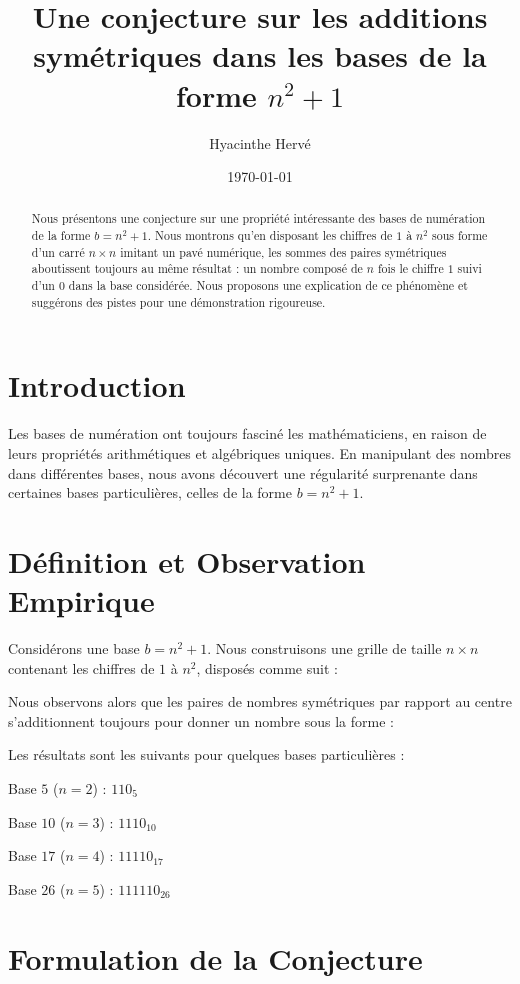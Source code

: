 \documentclass{article}
\title{Une conjecture sur les additions symétriques dans les bases de la forme $n^2 + 1$}
\author{Hyacinthe Hervé}
\date{\today}
\begin{document}
\maketitle

\begin{abstract}
Nous présentons une conjecture sur une propriété intéressante des bases de numération de la forme $b = n^2 + 1$. Nous montrons qu'en disposant les chiffres de $1$ à $n^2$ sous forme d'un carré $n \times n$ imitant un pavé numérique, les sommes des paires symétriques aboutissent toujours au même résultat : un nombre composé de $n$ fois le chiffre $1$ suivi d'un $0$ dans la base considérée. Nous proposons une explication de ce phénomène et suggérons des pistes pour une démonstration rigoureuse.
\end{abstract}

\section{Introduction}

Les bases de numération ont toujours fasciné les mathématiciens, en raison de leurs propriétés arithmétiques et algébriques uniques. En manipulant des nombres dans différentes bases, nous avons découvert une régularité surprenante dans certaines bases particulières, celles de la forme $b = n^2 + 1$.

\section{Définition et Observation Empirique}

Considérons une base $b = n^2 + 1$. Nous construisons une grille de taille $n \times n$ contenant les chiffres de $1$ à $n^2$, disposés comme suit :



Nous observons alors que les paires de nombres symétriques par rapport au centre s’additionnent toujours pour donner un nombre sous la forme :



Les résultats sont les suivants pour quelques bases particulières :

Base $5$ ($n=2$) : $110_5$

Base $10$ ($n=3$) : $1110_{10}$

Base $17$ ($n=4$) : $11110_{17}$

Base $26$ ($n=5$) : $111110_{26}$

\section{Formulation de la Conjecture}
\end{document}
